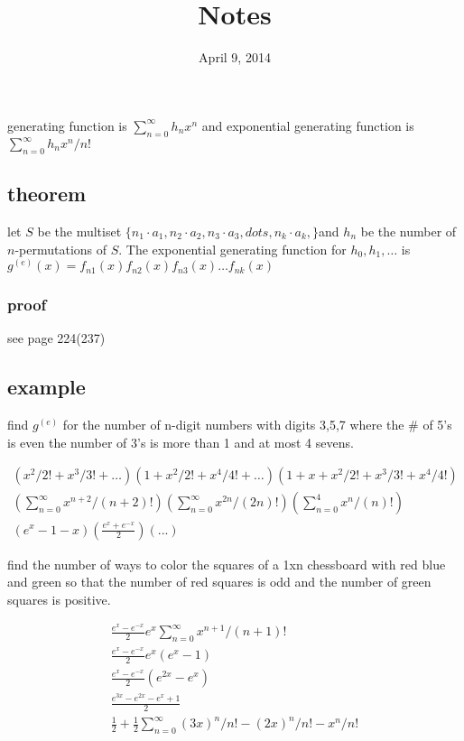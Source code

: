 \documentclass{article}
\begin{document}
\title{Notes}
\date{April 9, 2014}
\maketitle
generating function is $\sum\limits_{n=0}^\infty{h_nx^n}$ and exponential generating function is $\sum\limits_{n=0}^\infty{h_nx^n/n!}$

\subsection*{theorem}
let $S$ be the multiset $\{n_1\cdot a_1,n_2\cdot a_2,n_3\cdot a_3,dots,n_k\cdot a_k,\}$and $h_n$ be the number of $n$-permutations of $S$. The exponential generating function for $h_0,h_1,\dots$ is $g^{(e)}(x)=f_{n1}(x)f_{n2}(x)f_{n3}(x)\dots f_{nk}(x)$
\subsubsection*{proof}
see page 224(237)

\subsection*{example}
find $g^{(e)}$ for the number of n-digit numbers with digits 3,5,7 where the \# of 5's is even the number of 3's is more than 1 and at most 4 sevens.

\begin{align*}
  (x^2/2!+x^3/3!+\dots)(1+x^2/2!+x^4/4!+\dots)(1+x+x^2/2!+x^3/3!+x^4/4!)\\
  \left(\sum\limits_{n=0}^\infty{x^{n+2}/(n+2)!}\right)\left(\sum\limits_{n=0}^\infty{x^{2n}/(2n)!}\right)\left(\sum\limits_{n=0}^4{x^{n}/(n)!}\right)\\
  (e^x-1-x)(\frac{e^x+e^{-x}}{2})(...)
\end{align*}

find the number of ways to color the squares of a 1xn chessboard with red blue and green so that the number of red squares is odd and the number of green squares is positive.

\begin{align*}
  \frac{e^x-e^{-x}}{2}e^x\sum\limits_{n=0}^\infty{x^{n+1}/(n+1)!}\\
  \frac{e^x-e^{-x}}{2}e^x(e^x-1)\\
  \frac{e^x-e^{-x}}{2}(e^{2x}-e^x)\\
  \frac{e^{3x}-e^{2x}-e^{x}+1}{2}\\
  \frac{1}{2}+\frac{1}{2}\sum\limits_{n=0}^\infty{(3x)^n/n!-(2x)^n/n!-x^n/n!}\\
\end{align*}
\end{document}

